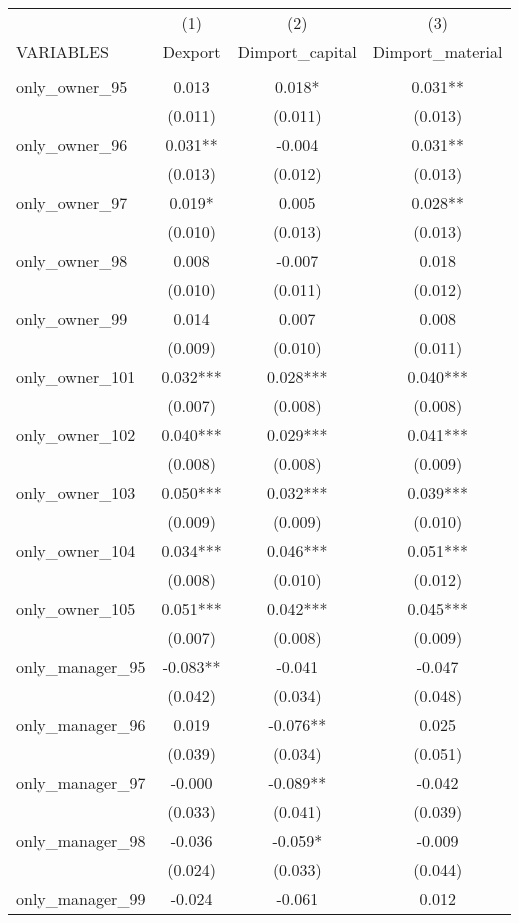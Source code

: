 \begin{tabular}{lccc} \hline
 & (1) & (2) & (3) \\
VARIABLES & Dexport & Dimport\_capital & Dimport\_material \\ \hline
 &  &  &  \\
only\_owner\_95 & 0.013 & 0.018* & 0.031** \\
 & (0.011) & (0.011) & (0.013) \\
only\_owner\_96 & 0.031** & -0.004 & 0.031** \\
 & (0.013) & (0.012) & (0.013) \\
only\_owner\_97 & 0.019* & 0.005 & 0.028** \\
 & (0.010) & (0.013) & (0.013) \\
only\_owner\_98 & 0.008 & -0.007 & 0.018 \\
 & (0.010) & (0.011) & (0.012) \\
only\_owner\_99 & 0.014 & 0.007 & 0.008 \\
 & (0.009) & (0.010) & (0.011) \\
only\_owner\_101 & 0.032*** & 0.028*** & 0.040*** \\
 & (0.007) & (0.008) & (0.008) \\
only\_owner\_102 & 0.040*** & 0.029*** & 0.041*** \\
 & (0.008) & (0.008) & (0.009) \\
only\_owner\_103 & 0.050*** & 0.032*** & 0.039*** \\
 & (0.009) & (0.009) & (0.010) \\
only\_owner\_104 & 0.034*** & 0.046*** & 0.051*** \\
 & (0.008) & (0.010) & (0.012) \\
only\_owner\_105 & 0.051*** & 0.042*** & 0.045*** \\
 & (0.007) & (0.008) & (0.009) \\
only\_manager\_95 & -0.083** & -0.041 & -0.047 \\
 & (0.042) & (0.034) & (0.048) \\
only\_manager\_96 & 0.019 & -0.076** & 0.025 \\
 & (0.039) & (0.034) & (0.051) \\
only\_manager\_97 & -0.000 & -0.089** & -0.042 \\
 & (0.033) & (0.041) & (0.039) \\
only\_manager\_98 & -0.036 & -0.059* & -0.009 \\
 & (0.024) & (0.033) & (0.044) \\
only\_manager\_99 & -0.024 & -0.061 & 0.012 \\

\end{tabular}
